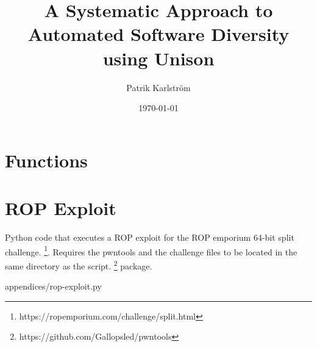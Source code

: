 \documentclass{kththesis}
\title{A Systematic Approach to Automated Software Diversity using Unison}
\author{Patrik Karlström}
\date{\today}
\begin{document}
\frontmatter

\titlepage






\tableofcontents


\mainmatter











\printbibliography[heading=bibintoc] %

\appendix

\chapter{Functions}
\label{appendix:function_names}


\chapter{ROP Exploit}
\label{appendix:rop-exploit}

Python code that executes a ROP exploit for the ROP emporium 64-bit split challenge.
\footnote{https://ropemporium.com/challenge/split.html}. Requires the pwntools and the
challenge files to be located in the same directory as the script.
\footnote{https://github.com/Gallopsled/pwntools} package.


{appendices/rop-exploit.py}
\end{document}
